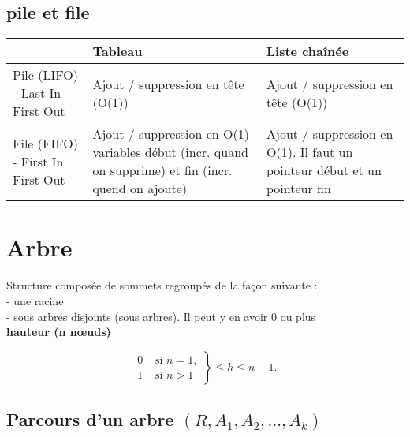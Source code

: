 \documentclass[8pt,a4paper]{extarticle}
\begin{document}
\begin{multicols}{3}
      \subsection{pile et file}

      {\scriptsize %
            \begin{tabularx}{\linewidth}{|X|X|X|}
                  \hline
                                                   & Tableau                                                                   & Liste chaînée                      \\
                  \hline
                  Pile (LIFO) - Last In First Out  & Ajout / suppression en tête (O(1))                                        & Ajout / suppression en tête (O(1)) \\
                  \hline
                  File (FIFO) - First In First Out & Ajout / suppression en O(1) variables début
                  (incr. quand on supprime) et fin (incr. quend on ajoute)
                                                   & Ajout / suppression en O(1). Il faut un pointeur début et un pointeur fin                                      \\
                  \hline
            \end{tabularx}
      }

      \section{Arbre}
      Structure composée de sommets regroupés de la façon suivante :\\
      - une racine\\
      - sous arbres disjoints (sous arbres). Il peut y en avoir 0
      ou plus\\
      \textbf{hauteur (n nœuds)}

      \[
            \left.
            \begin{aligned}
                  0 & \text{ si } n = 1, \\
                  1 & \text{ si } n > 1
            \end{aligned}
            \right\} \leq h \leq n - 1.
      \]


      \subsection{Parcours d'un arbre \((R, A_1, A_2, \dots, A_k)\)}


\end{multicols}
\end{document}

